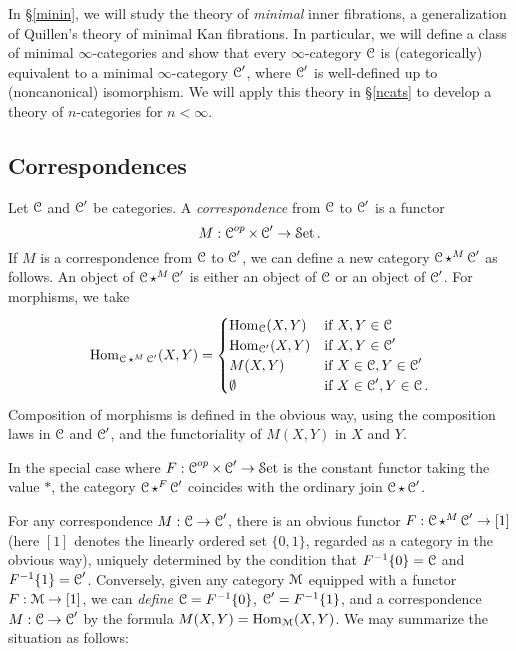 In \S \ref{minin}, we will study the theory of {\em minimal} inner fibrations, a generalization of Quillen's theory of minimal Kan fibrations. In particular, we will define a class of minimal $\infty$-categories and show that every $\infty$-category $\calC$ is (categorically) equivalent to a minimal $\infty$-category $\calC'$, where $\calC'$ is well-defined up to (noncanonical) isomorphism. We will apply this theory in \S \ref{ncats} to develop a theory of $n$-categories for $n < \infty$.

\subsection{Correspondences}\label{corresp}

Let $\calC$ and $\calC'$ be categories. A {\it correspondence} from $\calC$ to $\calC'$ is a functor
$$ M: \calC^{op} \times \calC' \rightarrow \Set.$$
If $M$ is a correspondence from $\calC$ to $\calC'$, we can define a new category $\calC \star^{M} \calC'$ as follows. An object of $\calC \star^{M} \calC'$ is either an object of $\calC$ or an object of $\calC'$. For morphisms, we take
$$ \Hom_{\calC \star^{M} \calC'}(X,Y) = \begin{cases} \Hom_{\calC}(X,Y) & \text{if } X,Y \in \calC \\
\Hom_{\calC'}(X,Y) & \text{if } X,Y \in \calC' \\
M(X,Y) & \text{if } X \in \calC, Y \in \calC' \\
\emptyset & \text{if } X \in \calC', Y \in \calC. \end{cases}$$
Composition of morphisms is defined in the obvious way, using the composition laws in $\calC$ and $\calC'$, and the functoriality of $M(X,Y)$ in $X$ and $Y$.

\begin{remark}
In the special case where $F: \calC^{op} \times \calC' \rightarrow \Set$ is the constant functor taking the value $\ast$, the category $\calC \star^{F} \calC'$ coincides with the ordinary join 
$\calC \star \calC'$.
\end{remark}

For any correspondence $M: \calC \rightarrow \calC'$, there is an obvious functor $F: \calC \star^{M} \calC' \rightarrow [1]$ (here $[1]$ denotes the linearly ordered set
$\{0,1\}$, regarded as a category in the obvious way), uniquely determined by the condition that $F^{-1} \{0\} = \calC$ and $F^{-1} \{1\} = \calC'$. Conversely, given any category $\calM$ equipped with a functor $F: \calM \rightarrow [1]$, we can {\em define} $\calC = F^{-1} \{0\}$, $\calC' = F^{-1} \{1\}$, and a correspondence $M: \calC \rightarrow \calC'$
by the formula $M(X,Y) = \Hom_{\calM}(X,Y)$. We may summarize the situation as follows:


